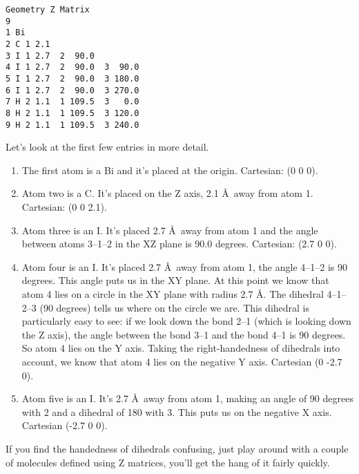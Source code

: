 \shrinkspacing
\begin{verbatim}
Geometry Z Matrix
9
1 Bi
2 C 1 2.1
3 I 1 2.7  2  90.0
4 I 1 2.7  2  90.0  3  90.0
5 I 1 2.7  2  90.0  3 180.0
6 I 1 2.7  2  90.0  3 270.0
7 H 2 1.1  1 109.5  3   0.0
8 H 2 1.1  1 109.5  3 120.0
9 H 2 1.1  1 109.5  3 240.0
\end{verbatim}
\resumespacing

Let's look at the first few entries in more detail.
\begin{enumerate}
\item The first atom is a Bi and it's placed at the origin.
Cartesian:  (0 0 0).  

\item Atom two is a C.  It's placed on the Z axis, 2.1 \AA\ away from
atom 1. Cartesian: (0 0 2.1).

\item Atom three is an I.  It's placed 2.7 \AA\ away from atom 1 and
the angle between atoms 3--1--2 in the XZ plane is 90.0 degrees.  
Cartesian: (2.7 0 0).

\item Atom four is an I.  It's placed 2.7 \AA\ away from atom 1, the
angle 4--1--2 is 90 degrees.  This angle puts us in the XY plane.  At
this point we know that atom 4 lies on a circle in the XY plane with
radius 2.7 \AA. The
dihedral 4--1--2--3 (90 degrees) tells us where on the circle we are. 
This dihedral is particularly easy to see:  if we look down the bond
2--1 (which is looking down the Z axis), the angle between the bond
3--1 and the bond 4--1 is 90 degrees.  So atom 4 lies on the Y axis.
Taking the right-handedness of dihedrals into account, we know that
atom 4 lies on the negative Y axis.  Cartesian (0 -2.7 0).

\item Atom five is an I.  It's 2.7 \AA\ away from atom 1, making an
angle of 90 degrees with 2 and a dihedral of 180 with 3.  This puts us
on the negative X axis.  Cartesian (-2.7 0 0).

\end{enumerate}

If you find the handedness of dihedrals confusing, just play around
with a couple of molecules defined using Z matrices, you'll get the
hang of it fairly quickly.

